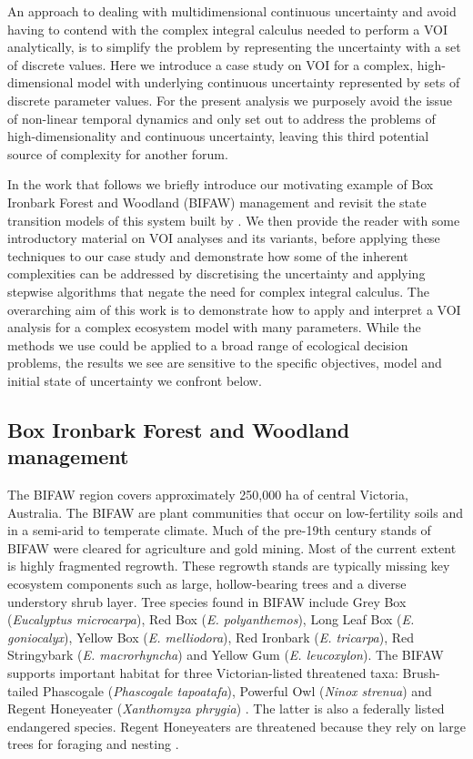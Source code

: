 \documentclass[draft]{article}
\theoremstyle{definition}
\theoremstyle{definition}
\theoremstyle{definition}
\theoremstyle{remark}
\begin{document}
An approach to dealing with multidimensional continuous uncertainty and
avoid having to contend with the complex integral calculus needed to
perform a VOI analytically, is to simplify the problem by representing
the uncertainty with a set of discrete values. Here we introduce a case
study on VOI for a complex, high-dimensional model with underlying
continuous uncertainty represented by sets of discrete parameter values.
For the present analysis we purposely avoid the issue of non-linear
temporal dynamics and only set out to address the problems of
high-dimensionality and continuous uncertainty, leaving this third
potential source of complexity for another forum.

In the work that follows we briefly introduce our motivating example of
Box Ironbark Forest and Woodland (BIFAW) management and revisit the
state transition models of this system built by \citet{Czembor2009}. We
then provide the reader with some introductory material on VOI analyses
and its variants, before applying these techniques to our case study and
demonstrate how some of the inherent complexities can be addressed by
discretising the uncertainty and applying stepwise algorithms that
negate the need for complex integral calculus. The overarching aim of
this work is to demonstrate how to apply and interpret a VOI analysis
for a complex ecosystem model with many parameters. While the methods we
use could be applied to a broad range of ecological decision problems,
the results we see are sensitive to the specific objectives, model and
initial state of uncertainty we confront below.

\subsection*{Box Ironbark Forest and Woodland
management}\label{box-ironbark-forest-and-woodland-management}

The BIFAW region covers approximately 250,000 ha of central Victoria,
Australia. The BIFAW are plant communities that occur on low-fertility
soils and in a semi-arid to temperate climate. Much of the pre-19th
century stands of BIFAW were cleared for agriculture and gold mining.
Most of the current extent is highly fragmented regrowth. These regrowth
stands are typically missing key ecosystem components such as large,
hollow-bearing trees and a diverse understory shrub layer. Tree species
found in BIFAW include Grey Box (\emph{Eucalyptus microcarpa}), Red Box
(\emph{E. polyanthemos}), Long Leaf Box (\emph{E. goniocalyx}), Yellow
Box (\emph{E. melliodora}), Red Ironbark (\emph{E. tricarpa}), Red
Stringybark (\emph{E. macrorhyncha}) and Yellow Gum (\emph{E.
leucoxylon}). The BIFAW supports important habitat for three
Victorian-listed threatened taxa: Brush-tailed Phascogale
(\emph{Phascogale tapoatafa}), Powerful Owl (\emph{Ninox strenua}) and
Regent Honeyeater (\emph{Xanthomyza phrygia}) \citep{Tzaros2005}. The
latter is also a federally listed endangered species. Regent Honeyeaters
are threatened because they rely on large trees for foraging and nesting
\citep{Menkhorst1999}.
\end{document}
